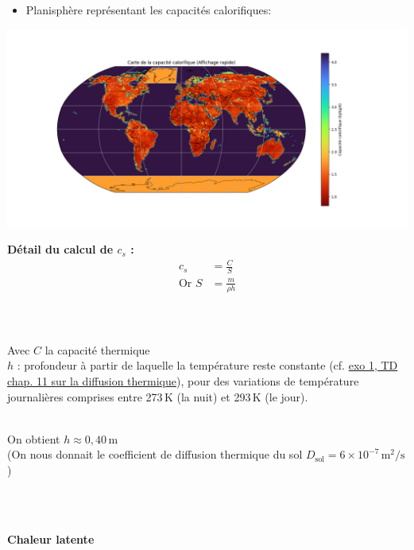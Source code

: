 \documentclass[a4paper,12pt]{article}
\begin{document}
\begin{itemize}
    \item Planisphère représentant les capacités calorifiques: 
\end{itemize}
\includegraphics[width=1.0\linewidth]{modele4/figures/c_humidite.png}

\textbf{Détail du calcul de \( c_s \) :}\\
\begin{align*}
c_s &= \frac{C}{S} \\
\text{Or } S &= \frac{m}{\rho h} \\

\end{align*}

\\
\\
Avec \( C \) la capacité thermique
\\

\(h\) : profondeur à partir de laquelle la température reste constante (cf. \href{https://gitlab.com/capecl/y2/-/blob/main/Cours%20et%20exercices/Chapitre_11%20:%20Diffusion%20thermique/TD/corr_chap11_td_vprof.pdf?ref_type=heads}{exo 1, TD chap. 11 sur la diffusion thermique}), pour des variations de température journalières comprises entre 273\,K (la nuit) et 293\,K (le jour).

\\
\vspace{0.5cm}
On obtient \( h \approx 0{,}40\,\mathrm{m} \)
\\

(On nous donnait le coefficient de diffusion thermique du sol \( D_{\text{sol}} = 6 \times 10^{-7} \,\mathrm{m}^2/\mathrm{s} \))

\\
\vspace{0,5cm}
\\

\textbf{Chaleur latente}
\\
\end{document}
